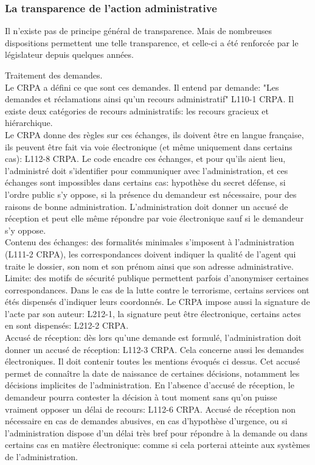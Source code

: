 \documentclass[10pt, a4paper, openany]{book}
\begin{document}
\subsubsection{La transparence de l'action administrative}

Il n'existe pas de principe général de transparence. Mais de nombreuses dispositions permettent une telle transparence, et celle-ci a été renforcée par le législateur depuis quelques années. 


Traitement des demandes. \\
Le CRPA a défini ce que sont ces demandes. Il entend par demande: "Les demandes et réclamations ainsi qu'un recours administratif" L110-1 CRPA. Il existe deux catégories de recours administratifs: les recours gracieux et hiérarchique. \\
Le CRPA donne des règles sur ces échanges, ils doivent être en langue française, ils peuvent être fait via voie électronique (et même uniquement dans certains cas): L112-8 CRPA. Le code encadre ces échanges, et pour qu'ils aient lieu, l'administré doit s'identifier pour communiquer avec l'administration, et ces échanges sont impossibles dans certains cas: hypothèse du secret défense, si l'ordre public s'y oppose, si la présence du demandeur est nécessaire, pour des raisons de bonne administration. L'administration doit donner un accusé de réception et peut elle même répondre par voie électronique sauf si le demandeur s'y oppose. \\
Contenu des échanges: des formalités minimales s'imposent à l'administration (L111-2 CRPA), les correspondances doivent indiquer la qualité de l'agent qui traite le dossier, son nom et son prénom ainsi que son adresse administrative. Limite: des motifs de sécurité publique permettent parfois d'anonymiser certaines correspondances. Dans le cas de la lutte contre le terrorisme, certains services ont étés dispensés d'indiquer leurs coordonnés. Le CRPA impose aussi la signature de l'acte par son auteur: L212-1, la signature peut être électronique, certains actes en sont dispensés: L212-2 CRPA. \\
Accusé de réception: dès lors qu'une demande est formulé, l'administration doit donner un accusé de réception: L112-3 CRPA. Cela concerne aussi les demandes électroniques. Il doit contenir toutes les mentions évoqués ci dessus. Cet accusé permet de connaître la date de naissance de certaines décisions, notamment les décisions implicites de l'administration. En l'absence d'accusé de réception, le demandeur pourra contester la décision à tout moment sans qu'on puisse vraiment opposer un délai de recours: L112-6 CRPA. Accusé de réception non nécessaire en cas de demandes abusives, en cas d'hypothèse d'urgence, ou si l'administration dispose d'un délai très bref pour répondre à la demande ou dans certains cas en matière électronique: comme si cela porterai atteinte aux systèmes de l'administration. \\
\end{document}
